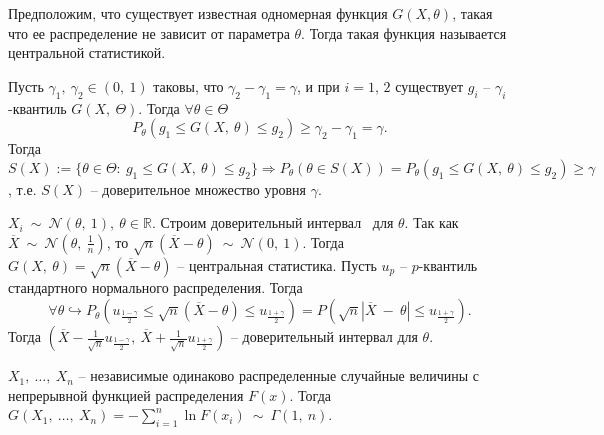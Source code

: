 \begin{definition}
    Предположим, что существует известная одномерная функция $\displaystyle G( X,\theta )$, такая что ее распределение не зависит от параметра $\displaystyle \theta $. Тогда такая функция называется центральной статистикой.
\end{definition}
Пусть $\displaystyle \gamma _{1} ,\ \gamma _{2} \in ( 0,\ 1)$ таковы, что $\displaystyle \gamma _{2} -\gamma _{1} =\gamma $, и при $\displaystyle i=1,\, 2$ существует $\displaystyle g_{i}$ -- $\displaystyle \gamma _{i}$-квантиль $\displaystyle G( X,\ \Theta )$. Тогда $\displaystyle \forall \theta \in \Theta $
\begin{equation*}
    P_{\theta }( g_{1} \leqslant G( X,\ \theta ) \leqslant g_{2}) \geqslant \gamma _{2} -\gamma _{1} =\gamma .
\end{equation*}
Тогда $\displaystyle S( X) :=\{\theta \in \Theta :\ g_{1} \leqslant G( X,\ \theta ) \leqslant g_{2}\} \Rightarrow P_{\theta }( \theta \in S( X)) =P_{\theta }( g_{1} \leqslant G( X,\ \theta ) \leqslant g_{2}) \geqslant \gamma $, т.е. $\displaystyle S( X)$ -- доверительное множество уровня $\displaystyle \gamma $.
\begin{example}
$\displaystyle X_{i} \ \sim \ \mathcal{N}( \theta ,\ 1) ,\ \theta \in \mathbb{R}$. Строим доверительный интервал \ для $\displaystyle \theta $. Так как $\displaystyle \overline{X} \ \sim \ \mathcal{N}\left( \theta ,\ \frac{1}{n}\right)$, то $\displaystyle \sqrt{n}(\overline{X} -\theta ) \ \sim \ \mathcal{N}( 0,\ 1)$. Тогда $\displaystyle G( X,\ \theta ) =\sqrt{n}(\overline{X} -\theta )$ -- центральная статистика. Пусть $\displaystyle u_{p}$ -- $\displaystyle p$-квантиль стандартного нормального распределения. Тогда
\begin{equation*}
\forall \theta \hookrightarrow P_{\theta }\left( u_{\frac{1-\gamma }{2}} \leqslant \sqrt{n}(\overline{X} -\theta ) \leqslant u_{\frac{1+\gamma }{2}}\right) =P\left(\sqrt{n}| \overline{X} \ -\ \theta | \leqslant u_{\frac{1+\gamma }{2}}\right) .
\end{equation*}
Тогда $\displaystyle \left(\overline{X} -\frac{1}{\sqrt{n}} u_{\frac{1-\gamma }{2}} ,\ \overline{X} +\frac{1}{\sqrt{n}} u_{\frac{1+\gamma }{2}}\right)$ -- доверительный интервал для $\displaystyle \theta $.
\end{example}
\begin{lemma}
$\displaystyle X_{1} ,\ \dotsc ,\ X_{n}$ -- независимые одинаково распределенные случайные величины с непрерывной функцией распределения $\displaystyle F( x)$. Тогда $\displaystyle G( X_{1} ,\ \dotsc ,\ X_{n}) =-\sum _{i=1}^{n}\ln F( x_{i}) \ \sim \ \Gamma ( 1,\ n)$.
\end{lemma}

